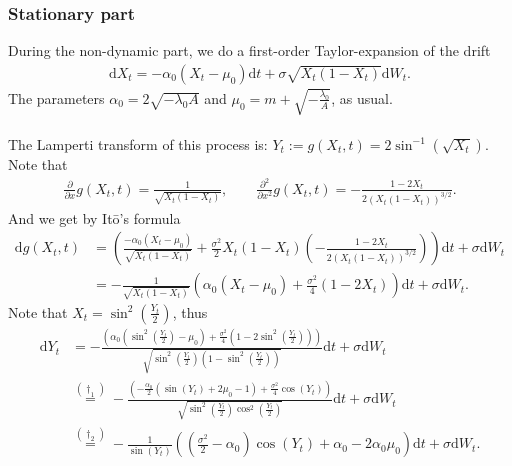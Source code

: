 \subsubsection{Stationary part}
During the non-dynamic part, we do a first-order Taylor-expansion of the drift
\begin{align}
    \mathrm{d}X_t = -\alpha_0\left(X_t - \mu_0\right)\mathrm{d}t + \sigma \sqrt{X_t\left(1 - X_t\right)}\mathrm{d}W_t.
\end{align}
The parameters $\alpha_0 = 2\sqrt{-\lambda_0 A}$ and $\mu_0 = m + \sqrt{-\frac{\lambda_0}{A}}$, as usual.\\\\
The Lamperti transform of this process is: $Y_t := g(X_t,t) = 2 \sin^{-1}\left(\sqrt{X_t}\right)$.
Note that
\begin{align}
    \frac{\partial}{\partial x}g(X_t,t) = \frac{1}{\sqrt{X_t\left(1 - X_t\right)}}, \qquad \frac{\partial^2}{\partial x^2}g(X_t,t) = -\frac{1 - 2X_t}{2\left(X_t\left(1 - X_t\right)\right)^{3/2}}.
\end{align}
And we get by Itō's formula
\begin{align}
    \mathrm{d}g(X_t, t) &= \left(\frac{-\alpha_0\left(X_t - \mu_0\right)}{\sqrt{X_t\left(1 - X_t\right)}} + \frac{\sigma^2}{2}X_t\left(1 - X_t\right)\left(-\frac{1 - 2X_t}{2\left(X_t\left(1 - X_t\right)\right)^{3/2}}\right)\right)\mathrm{d}t + \sigma\mathrm{d}W_t \nonumber \\
    &= -\frac{1}{\sqrt{X_t\left(1 - X_t\right)}}\left(\alpha_0\left(X_t - \mu_0\right) + \frac{\sigma^2}{4}\left(1 - 2X_t\right)\right)\mathrm{d}t + \sigma\mathrm{d}W_t.
\end{align}
Note that $X_t = \sin^2\left(\frac{Y_t}{2}\right)$, thus
\begin{align}
    \mathrm{d}Y_t & = -\frac{\left(\alpha_0\left(\sin^2\left(\frac{Y_t}{2}\right) - \mu_0\right) + \frac{\sigma^2}{4}\left(1 - 2\sin^2\left(\frac{Y_t}{2}\right)\right)\right)}{\sqrt{\sin^2\left(\frac{Y_t}{2}\right)\left(1 - \sin^2\left(\frac{Y_t}{2}\right)\right)}}\mathrm{d}t  + \sigma\mathrm{d}W_t \nonumber \\
    & \overset{(\dagger_1)}{=} -\frac{\left(-\frac{\alpha_0}{2}\left(\sin\left(Y_t\right) + 2\mu_0 - 1\right) + \frac{\sigma^2}{4}\cos(Y_t)\right)}{\sqrt{\sin^2\left(\frac{Y_t}{2}\right)\cos^2\left(\frac{Y_t}{2}\right)}}\mathrm{d}t  + \sigma\mathrm{d}W_t \nonumber \\
    & \overset{(\dagger_2)}{=} -\frac{1}{\sin\left(Y_t\right)}\left(\left(\frac{\sigma^2}{2}-\alpha_0\right)\cos(Y_t) + \alpha_0 - 2\alpha_0\mu_0\right)\mathrm{d}t + \sigma \mathrm{d}W_t. \label{eq:JacobiLampertiSDE}
\end{align}
